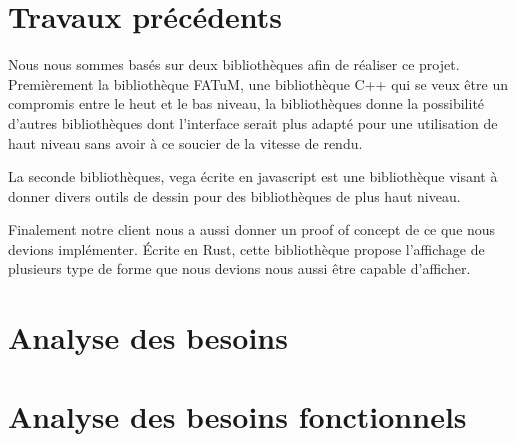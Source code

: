 \documentclass[12pt]{article}
\begin{document}
\section{Travaux précédents}

Nous nous sommes basés sur deux bibliothèques afin de réaliser ce projet.
Premièrement la bibliothèque FATuM, une bibliothèque C++ qui se veux être un compromis entre le heut et le bas niveau, la bibliothèques donne la possibilité d'autres bibliothèques dont l'interface serait plus adapté pour une utilisation de haut niveau sans avoir à ce soucier de la vitesse de rendu.

La seconde bibliothèques, vega écrite en javascript est une bibliothèque visant à donner divers outils de dessin pour des bibliothèques de plus haut niveau.

Finalement notre client nous a aussi donner un proof of concept de ce que nous devions implémenter. Écrite en Rust, cette bibliothèque propose l'affichage de plusieurs type de forme que nous devions nous aussi être capable d'afficher.    

\section{Analyse des besoins}
\section{Analyse des besoins fonctionnels}
\end{document}
